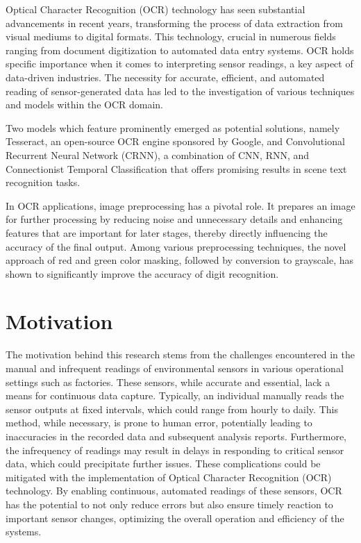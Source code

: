 Optical Character Recognition (OCR) technology has seen substantial advancements in recent years, transforming the process of data extraction from visual mediums to digital formats. This technology, crucial in numerous fields ranging from document digitization to automated data entry systems. OCR holds specific importance when it comes to interpreting sensor readings, a key aspect of data-driven industries. The necessity for accurate, efficient, and automated reading of sensor-generated data has led to the investigation of various techniques and models within the OCR domain.

Two models which feature prominently emerged as potential solutions, namely Tesseract, an open-source OCR engine sponsored by Google, and Convolutional Recurrent Neural Network (CRNN), a combination of CNN, RNN, and Connectionist Temporal Classification that offers promising results in scene text recognition tasks.

In OCR applications, image preprocessing has a pivotal role. It prepares an image for further processing by reducing noise and unnecessary details and enhancing features that are important for later stages, thereby directly influencing the accuracy of the final output. Among various preprocessing techniques, the novel approach of red and green color masking, followed by conversion to grayscale, has shown to significantly improve the accuracy of digit recognition.




\section{Motivation}


The motivation behind this research stems from the challenges encountered in the manual and infrequent readings of environmental sensors in various operational settings such as factories. These sensors, while accurate and essential, lack a means for continuous data capture. Typically, an individual manually reads the sensor outputs at fixed intervals, which could range from hourly to daily. This method, while necessary, is prone to human error, potentially leading to inaccuracies in the recorded data and subsequent analysis reports. Furthermore, the infrequency of readings may result in delays in responding to critical sensor data, which could precipitate further issues. These complications could be mitigated with the implementation of Optical Character Recognition (OCR) technology. By enabling continuous, automated readings of these sensors, OCR has the potential to not only reduce errors but also ensure timely reaction to important sensor changes, optimizing the overall operation and efficiency of the systems.

